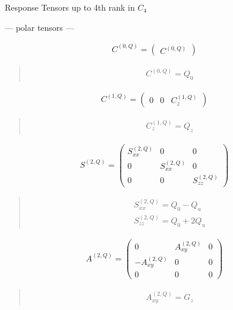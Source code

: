 \documentclass[fleqn,10pt]{jsarticle}
\begin{document}
\setcounter{MaxMatrixCols}{16}

\begin{center}
\LARGE
Response Tensors up to 4th rank in $C_{4}$
\end{center}
\begin{center}\LARGE --- polar tensors ---\end{center}
\begin{align*}
C^{(0,Q)} = \begin{pmatrix} C^{(0,Q)} \end{pmatrix}
\end{align*}
\begin{quote}
\begin{align*}
& C^{(0,Q)} = Q_{0}
\end{align*}
\end{quote}
\begin{align*}
C^{(1,Q)} = \begin{pmatrix} 0 & 0 & C^{(1,Q)}_{z} \end{pmatrix}
\end{align*}
\begin{quote}
\begin{align*}
& C^{(1,Q)}_{z} = Q_{z}
\end{align*}
\end{quote}
\begin{align*}
S^{(2,Q)} = \begin{pmatrix} S^{(2,Q)}_{xx} & 0 & 0 \\ 0 & S^{(2,Q)}_{xx} & 0 \\ 0 & 0 & S^{(2,Q)}_{zz} \end{pmatrix}
\end{align*}
\begin{quote}
\begin{align*}
& S^{(2,Q)}_{xx} = Q_{0} - Q_{u} \\
& S^{(2,Q)}_{zz} = Q_{0} + 2 Q_{u}
\end{align*}
\end{quote}
\begin{align*}
A^{(2,Q)} = \begin{pmatrix} 0 & A^{(2,Q)}_{xy} & 0 \\ - A^{(2,Q)}_{xy} & 0 & 0 \\ 0 & 0 & 0 \end{pmatrix}
\end{align*}
\begin{quote}
\begin{align*}
& A^{(2,Q)}_{xy} = G_{z}
\end{align*}
\end{quote}
\end{document}
